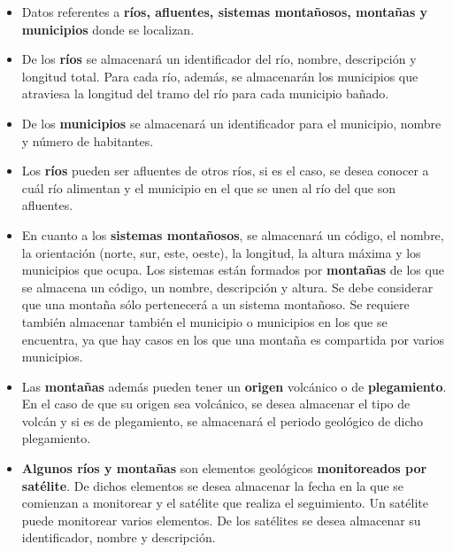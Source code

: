 \documentclass[12pt, letterpaper]{article}
\begin{document}
            \begin{itemize}
                \item Datos referentes a \textbf{ríos, afluentes, sistemas montañosos, 
                      montañas y municipios} donde se localizan.
                \item De los \textbf{ríos} se almacenará un identificador del río, nombre,
                      descripción y longitud total. Para cada río, además, se 
                      almacenarán los municipios que atraviesa la longitud del 
                      tramo del río para cada municipio bañado.
                \item De los \textbf{municipios} se almacenará un identificador para el
                      municipio, nombre y número de habitantes.
                \item Los \textbf{ríos} pueden ser afluentes de otros ríos, si es 
                      el caso, se desea conocer a cuál río alimentan y el municipio 
                      en el que se unen al río del que son afluentes.
                \item En cuanto a los \textbf{sistemas montañosos}, se almacenará 
                      un código, el nombre, la orientación (norte, sur, este, 
                      oeste), la longitud, la altura máxima y los municipios 
                      que ocupa. Los sistemas están formados por \textbf{montañas} 
                      de los que se almacena un código, un nombre, descripción y
                      altura. Se debe considerar que una montaña sólo pertenecerá
                      a un sistema montañoso. Se requiere también almacenar también 
                      el municipio o municipios en los que se encuentra, ya que 
                      hay casos en los que una montaña es compartida por varios
                      municipios.
                \item Las \textbf{montañas} además pueden tener un \textbf{origen} 
                      volcánico o de \textbf{plegamiento}. En el caso de que
                      su origen sea volcánico, se desea almacenar el tipo de 
                      volcán y si es de plegamiento, se almacenará el periodo 
                      geológico de dicho plegamiento.
                \item \textbf{Algunos ríos y montañas} son elementos geológicos 
                      \textbf{monitoreados por satélite}. De dichos elementos 
                      se desea almacenar la fecha en la que se comienzan a 
                      monitorear y el satélite que realiza el seguimiento. 
                      Un satélite puede monitorear varios elementos. De los 
                      satélites se desea almacenar su identificador, nombre 
                      y descripción.
            \end{itemize}
\end{document}
